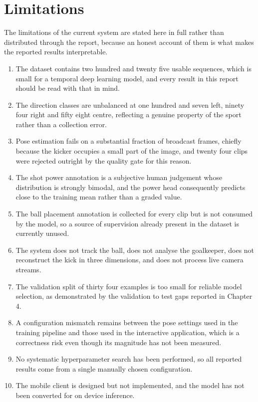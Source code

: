 \section{Limitations}

The limitations of the current system are stated here in full rather than distributed through the report, because an honest account of them is what makes the reported results interpretable.

\begin{enumerate}[label=\roman*.]
    \item The dataset contains two hundred and twenty five usable sequences, which is small for a temporal deep learning model, and every result in this report should be read with that in mind.
    \item The direction classes are unbalanced at one hundred and seven left, ninety four right and fifty eight centre, reflecting a genuine property of the sport rather than a collection error.
    \item Pose estimation fails on a substantial fraction of broadcast frames, chiefly because the kicker occupies a small part of the image, and twenty four clips were rejected outright by the quality gate for this reason.
    \item The shot power annotation is a subjective human judgement whose distribution is strongly bimodal, and the power head consequently predicts close to the training mean rather than a graded value.
    \item The ball placement annotation is collected for every clip but is not consumed by the model, so a source of supervision already present in the dataset is currently unused.
    \item The system does not track the ball, does not analyse the goalkeeper, does not reconstruct the kick in three dimensions, and does not process live camera streams.
    \item The validation split of thirty four examples is too small for reliable model selection, as demonstrated by the validation to test gaps reported in Chapter 4.
    \item A configuration mismatch remains between the pose settings used in the training pipeline and those used in the interactive application, which is a correctness risk even though its magnitude has not been measured.
    \item No systematic hyperparameter search has been performed, so all reported results come from a single manually chosen configuration.
    \item The mobile client is designed but not implemented, and the model has not been converted for on device inference.
\end{enumerate}

